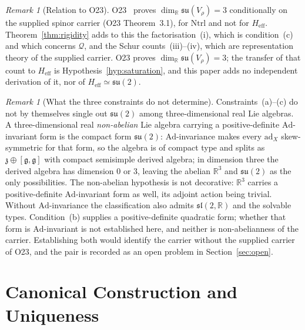 \documentclass[11pt,a4paper]{article}
\theoremstyle{remark}
\newtheorem{remark}[theorem]{Remark}
\begin{document}
  \begin{remark}[Relation to O23]
    \label{rem:o23}
    O23~\cite{Beau2026a27} proves $\dim_{\mathbb{R}} \mathfrak{su}(V_\rho) = 3$ conditionally on
    the supplied spinor carrier (O23 Theorem~3.1), for $\mathrm{Ntrl}$ and not for
    $H_{\mathrm{eff}}$.
    Theorem~\ref{thm:rigidity} adds to this the factorisation~(i), which is condition~(c) and which
    concerns $\mathcal{Q}$, and the Schur counts~(iii)--(iv), which are representation theory of the
    supplied carrier.
    O23 proves $\dim_{\mathbb{R}} \mathfrak{su}(V_\rho) = 3$; the transfer of that count to
    $H_{\mathrm{eff}}$ is Hypothesis~\ref{hyp:saturation}, and this paper adds no independent
    derivation of it, nor of $H_{\mathrm{eff}} \simeq \mathfrak{su}(2)$.
  \end{remark}

  \begin{remark}[What the three constraints do not determine]
    \label{rem:not-determined}
    Constraints~(a)--(c) do not by themselves single out $\mathfrak{su}(2)$ among three-dimensional
    real Lie algebras.
    A three-dimensional real \emph{non-abelian} Lie algebra carrying a positive-definite
    $\mathrm{Ad}$-invariant form is the compact form $\mathfrak{su}(2)$: $\mathrm{Ad}$-invariance
    makes every $\mathrm{ad}_X$ skew-symmetric for that form, so the algebra is of compact type and
    splits as $\mathfrak{z} \oplus [\mathfrak{g},\mathfrak{g}]$ with compact semisimple derived
    algebra; in dimension three the derived algebra has dimension $0$ or $3$, leaving the abelian
    $\mathbb{R}^3$ and $\mathfrak{su}(2)$ as the only possibilities.
    The non-abelian hypothesis is not decorative: $\mathbb{R}^3$ carries a positive-definite
    $\mathrm{Ad}$-invariant form as well, its adjoint action being trivial.
    Without $\mathrm{Ad}$-invariance the classification also admits $\mathfrak{sl}(2,\mathbb{R})$
    and the solvable types.
    Condition~(b) supplies a positive-definite quadratic form; whether that form is
    $\mathrm{Ad}$-invariant is not established here, and neither is non-abelianness of the carrier.
    Establishing both would identify the carrier without the supplied carrier of O23, and the pair
    is recorded as an open problem in Section~\ref{sec:open}.
  \end{remark}

  \section{Canonical Construction and Uniqueness}
  \label{sec:construction}
\end{document}
